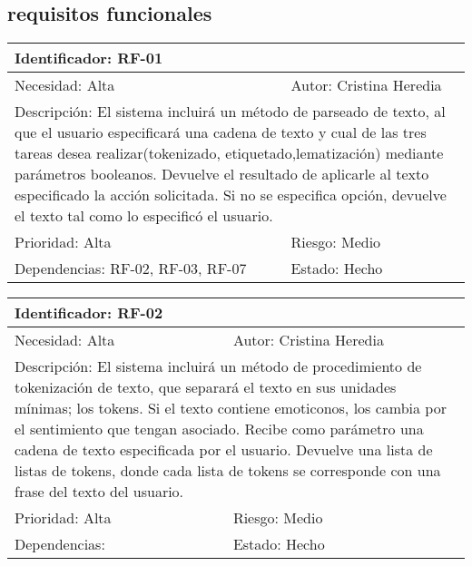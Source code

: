 \subsection*{requisitos funcionales}
\begin{table}[H]
\label{my-label}
\begin{tabular}{|l|l|l|l|l|l|l|}
\hline
\multicolumn{7}{|l|}{\textcolor{SchoolColor}{Identificador:} RF-01}                                 \\ \hline
\multicolumn{4}{|l|}{\textcolor{SchoolColor}{Necesidad:} Alta} & \multicolumn{3}{l|}{\textcolor{SchoolColor}{Autor:} Cristina Heredia}         \\ \hline
\multicolumn{7}{|L|}{\textcolor{SchoolColor}{Descripción:} El sistema incluirá un método de parseado de texto, al que el usuario  especificará una cadena de texto y cual de las tres tareas desea realizar(tokenizado, etiquetado,lematización) mediante parámetros booleanos. Devuelve el resultado de aplicarle al texto especificado la acción solicitada. Si no se especifica opción, devuelve el texto tal como lo especificó el usuario.  }                                 \\ \hline
\multicolumn{4}{|l|}{\textcolor{SchoolColor}{Prioridad: }Alta} & \multicolumn{3}{l|}{\textcolor{SchoolColor}{Riesgo:} Medio}         \\ \hline
\multicolumn{5}{|l|}{\textcolor{SchoolColor}{Dependencias: }RF-02, RF-03, RF-07}         & \multicolumn{2}{l|}{\textcolor{SchoolColor}{Estado:} Hecho} \\ \hline
\end{tabular}
\end{table}
\begin{table}[H]
\label{my-label}
\begin{tabular}{|l|l|l|l|l|l|l|}
\hline
\multicolumn{7}{|l|}{\textcolor{SchoolColor}{Identificador:} RF-02}                                 \\ \hline
\multicolumn{4}{|l|}{\textcolor{SchoolColor}{Necesidad:} Alta} & \multicolumn{3}{l|}{\textcolor{SchoolColor}{Autor:} Cristina Heredia}         \\ \hline
\multicolumn{7}{|L|}{\textcolor{SchoolColor}{Descripción:} El sistema incluirá un método de procedimiento de tokenización de texto, que separará el texto en sus unidades mínimas; los tokens. Si el texto contiene emoticonos, los cambia por el sentimiento que tengan asociado. Recibe como parámetro una cadena de texto especificada por el usuario. Devuelve una lista de listas de tokens, donde cada lista de tokens se corresponde con una frase del texto del usuario. }                                 \\ \hline
\multicolumn{4}{|l|}{\textcolor{SchoolColor}{Prioridad: }Alta} & \multicolumn{3}{l|}{\textcolor{SchoolColor}{Riesgo:} Medio}         \\ \hline
\multicolumn{5}{|l|}{\textcolor{SchoolColor}{Dependencias: }}         & \multicolumn{2}{l|}{\textcolor{SchoolColor}{Estado:} Hecho} \\ \hline
\end{tabular}
\end{table}

